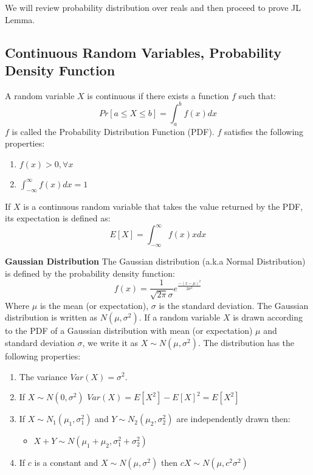 \documentclass[11pt]{article}
\begin{document}
We will review probability distribution over reals and then proceed to prove JL Lemma.
\subsection{Continuous Random Variables, Probability Density Function}
A random variable $X$ is continuous if there exists a function $f$ such that:
\begin{equation}
Pr\left[a \leq X \leq b\right]=\int_{a}^{b}f(x)dx
\end{equation}
$f$ is called the Probability Distribution Function (PDF). $f$ satisfies the following properties:
\begin{enumerate}
\item $f(x)>0, \forall x$ 
\item $\int_{-\infty}^{\infty}f(x)dx=1$
\end{enumerate}

If $X$ is a continuous random variable that takes the value returned by the PDF, its expectation is defined as:
\begin{equation}
E[X] = \int_{-\infty}^{\infty}f(x)x dx
\end{equation}

\textbf{Gaussian Distribution}
The Gaussian distribution (a.k.a Normal Distribution) is defined by the probability density function:
\begin{equation}
f(x) = \frac{1}{\sqrt{2\pi}\sigma}e^{\frac{-(x-\mu)^2}{2\sigma^2}}
\end{equation}
Where $\mu$ is the mean (or expectation), $\sigma$ is the standard deviation. The Gaussian distribution is written as $N(\mu,\sigma^2)$. If a random variable $X$ is drawn according to the PDF of a Gaussian distribution with mean (or expectation) $\mu$ and standard deviation $\sigma$, we write it as $X\sim N(\mu,\sigma^2)$. The distribution has the following properties:
\begin{enumerate}
\item The variance $Var(X)=\sigma^2$.
\item If $X\sim N(0,\sigma^2)$ $Var(X)= E[X^2] - E[X]^2 = E[X^2]$
\item If $X\sim N_1(\mu_1,\sigma_1^2)$ and $Y\sim N_2(\mu_2,\sigma_2^2)$ are independently drawn then:
    \begin{itemize}
        \item $X+Y \sim N(\mu_1 + \mu_2, \sigma_1^2 + \sigma_2^2)$
    \end{itemize}
\item If $c$ is a constant and $X\sim N(\mu,\sigma^2)$ then $cX\sim N(\mu, c^2\sigma^2)$
\end{enumerate}
\end{document}
